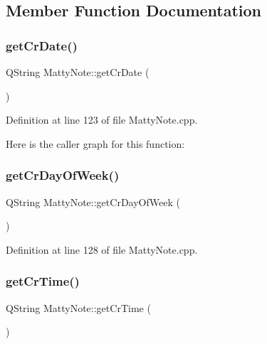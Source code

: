 \subsection{Member Function Documentation}
\hypertarget{classMattyNote_ade5ef053d6d9ba158d9842feadd39754}{}\label{classMattyNote_ade5ef053d6d9ba158d9842feadd39754} 
\subsubsection{\texorpdfstring{get\+Cr\+Date()}{getCrDate()}}
{\footnotesize\ttfamily Q\+String Matty\+Note\+::get\+Cr\+Date (\begin{DoxyParamCaption}{ }\end{DoxyParamCaption})}



Definition at line 123 of file Matty\+Note.\+cpp.

Here is the caller graph for this function\+:
\hypertarget{classMattyNote_a92dca9930c5f9b00991a780fc89acb8f}{}\label{classMattyNote_a92dca9930c5f9b00991a780fc89acb8f} 
\subsubsection{\texorpdfstring{get\+Cr\+Day\+Of\+Week()}{getCrDayOfWeek()}}
{\footnotesize\ttfamily Q\+String Matty\+Note\+::get\+Cr\+Day\+Of\+Week (\begin{DoxyParamCaption}{ }\end{DoxyParamCaption})}



Definition at line 128 of file Matty\+Note.\+cpp.

\hypertarget{classMattyNote_a2acf19aded7d4b5c29db7af6b0c4b1f6}{}\label{classMattyNote_a2acf19aded7d4b5c29db7af6b0c4b1f6} 
\subsubsection{\texorpdfstring{get\+Cr\+Time()}{getCrTime()}}
{\footnotesize\ttfamily Q\+String Matty\+Note\+::get\+Cr\+Time (\begin{DoxyParamCaption}{ }\end{DoxyParamCaption})}



